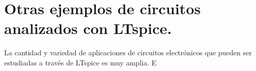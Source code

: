 \chapter{Otras ejemplos de circuitos analizados con LTspice.}\label{otros}

{\hspace{10pt}} La cantidad y variedad de aplicaciones de circuitos electrónicos que pueden ser estudiadas a través de LTspice es muy amplia. E